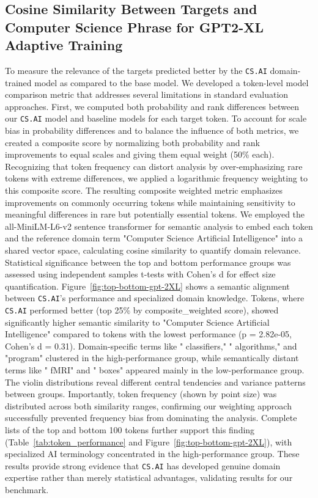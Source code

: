 \documentclass[10pt]{article}
\begin{document}

\subsection{Cosine Similarity Between Targets and Computer Science Phrase for GPT2-XL Adaptive Training}
\label{subsec:supplementary_top_bottom_25_gpt2_adaptive}

To measure the relevance of the targets predicted better by the \texttt{CS.AI} domain-trained model as compared to the base model. We developed a token-level model comparison metric that addresses several limitations in standard evaluation approaches. First, we computed both probability and rank differences between our \texttt{CS.AI} model and baseline models for each target token. To account for scale bias in probability differences and to balance the influence of both metrics, we created a composite score by normalizing both probability and rank improvements to equal scales and giving them equal weight (50\% each). Recognizing that token frequency can distort analysis by over-emphasizing rare tokens with extreme differences, we applied a logarithmic frequency weighting to this composite score. The resulting composite weighted metric emphasizes improvements on commonly occurring tokens while maintaining sensitivity to meaningful differences in rare but potentially essential tokens. We employed the all-MiniLM-L6-v2 sentence transformer for semantic analysis to embed each token and the reference domain term "Computer Science Artificial Intelligence" into a shared vector space, calculating cosine similarity to quantify domain relevance. Statistical significance between the top and bottom performance groups was assessed using independent samples t-tests with Cohen's d for effect size quantification.
Figure~\ref{fig:top-bottom-gpt-2XL} shows a semantic alignment between \texttt{CS.AI}'s performance and specialized domain knowledge. Tokens, where \texttt{CS.AI} performed better (top 25\% by composite\_weighted score), showed significantly higher semantic similarity to "Computer Science Artificial Intelligence" compared to tokens with the lowest performance (p = 2.82e-05, Cohen's d = 0.31). Domain-specific terms like " classifiers," " algorithms," and "program" clustered in the high-performance group, while semantically distant terms like " fMRI" and " boxes" appeared mainly in the low-performance group. The violin distributions reveal different central tendencies and variance patterns between groups. Importantly, token frequency (shown by point size) was distributed across both similarity ranges, confirming our weighting approach successfully prevented frequency bias from dominating the analysis. Complete lists of the top and bottom 100 tokens further support this finding (Table~\ref{tab:token_performance} and Figure~\ref{fig:top-bottom-gpt-2XL}), with specialized AI terminology concentrated in the high-performance group. These results provide strong evidence that \texttt{CS.AI} has developed genuine domain expertise rather than merely statistical advantages, validating results for our benchmark.
\end{document}
